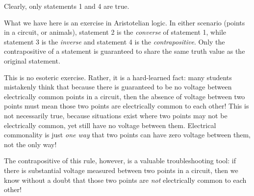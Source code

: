 Clearly, only statements 1 and 4 are true.







What we have here is an exercise in Aristotelian logic.  In either scenario (points in a circuit, or animals), statement 2 is the {\it converse} of statement 1, while statement 3 is the {\it inverse} and statement 4 is the {\it contrapositive}.  Only the contrapositive of a statement is guaranteed to share the same truth value as the original statement.

This is no esoteric exercise.  Rather, it is a hard-learned fact: many students mistakenly think that because there is guaranteed to be no voltage between electrically common points in a circuit, then the absence of voltage between two points must mean those two points are electrically common to each other!  This is not necessarily true, because situations exist where two points may not be electrically common, yet still have no voltage between them.  Electrical commonality is just {\it one way} that two points can have zero voltage between them, not the only way!

The contrapositive of this rule, however, is a valuable troubleshooting tool: if there is substantial voltage measured between two points in a circuit, then we know without a doubt that those two points are {\it not} electrically common to each other!




